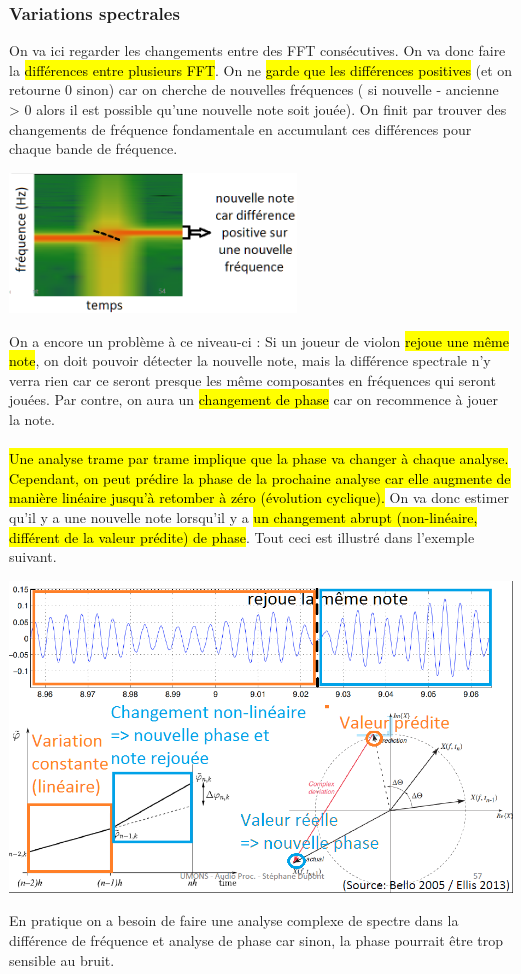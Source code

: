 \documentclass[letterpaper, 12pt]{article}
\newcommand{\alinea}{
\hspace*{0.5cm}}
\begin{document}
			\subsubsection{Variations spectrales}
				\alinea On va ici regarder les changements entre des FFT consécutives. On va donc faire la \hl{différences entre plusieurs
					FFT}. On ne \hl{garde que les différences positives} (et on retourne 0 sinon) car on cherche de nouvelles fréquences 
					( si nouvelle - ancienne > 0 alors il est possible qu'une nouvelle note soit jouée). On finit par trouver des 
					changements de fréquence fondamentale en accumulant ces différences pour chaque bande de fréquence.
				\begin{center}
					\includegraphics[width=3in]{Images/spectral}
				\end{center}
				\alinea On a encore un problème à ce niveau-ci : Si un joueur de violon \hl{rejoue une même note}, on doit pouvoir détecter
					la nouvelle note, mais la différence spectrale n'y verra rien car ce seront presque les même composantes en fréquences 
					qui seront jouées. Par contre, on aura un \hl{changement de phase} car on recommence à jouer la note.\\
				~\\			
				\alinea \hl{Une analyse trame par trame implique que la phase va changer à chaque analyse. Cependant, on peut prédire la phase
					de la prochaine analyse car elle augmente de manière linéaire jusqu'à retomber à zéro (évolution cyclique).}
					On va donc estimer qu'il y a une nouvelle note lorsqu'il y a \hl{un changement abrupt (non-linéaire, différent de la
					valeur prédite) de phase}. Tout ceci est illustré dans l'exemple suivant.
				\begin{center}
					\includegraphics[width=\textwidth]{Images/phase}
				\end{center}
				\alinea En pratique on a besoin de faire une analyse complexe de spectre dans la différence de fréquence et analyse de phase
					car sinon, la phase pourrait être trop sensible au bruit.
\end{document}
